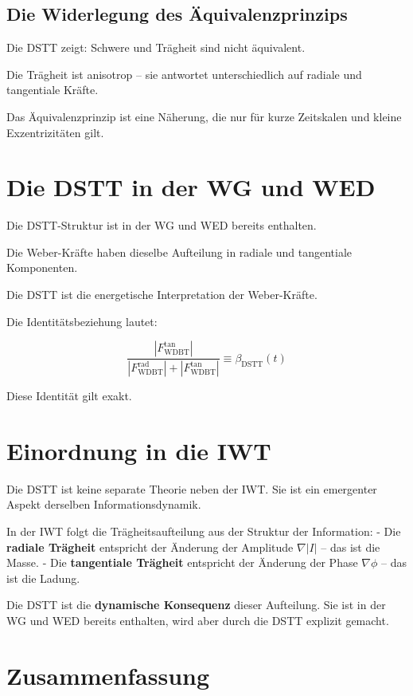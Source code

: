 \subsection{Die Widerlegung des Äquivalenzprinzips}

Die DSTT zeigt: Schwere und Trägheit sind nicht äquivalent.

Die Trägheit ist anisotrop – sie antwortet unterschiedlich auf radiale und tangentiale Kräfte.

Das Äquivalenzprinzip ist eine Näherung, die nur für kurze Zeitskalen und kleine Exzentrizitäten gilt.

\section{Die DSTT in der WG und WED}

Die DSTT-Struktur ist in der WG und WED bereits enthalten.

Die Weber-Kräfte haben dieselbe Aufteilung in radiale und tangentiale Komponenten.

Die DSTT ist die energetische Interpretation der Weber-Kräfte.

Die Identitätsbeziehung lautet:

\[
\frac{|F_{\text{WDBT}}^{\text{tan}}|}{|F_{\text{WDBT}}^{\text{rad}}| + |F_{\text{WDBT}}^{\text{tan}}|}
\equiv \beta_{\text{DSTT}}(t)
\]

Diese Identität gilt exakt.

\section{Einordnung in die IWT}

Die DSTT ist keine separate Theorie neben der IWT. Sie ist ein emergenter Aspekt derselben Informationsdynamik.

In der IWT folgt die Trägheitsaufteilung aus der Struktur der Information:
- Die \textbf{radiale Trägheit} entspricht der Änderung der Amplitude \( \nabla |I| \) – das ist die Masse.
- Die \textbf{tangentiale Trägheit} entspricht der Änderung der Phase \( \nabla \phi \) – das ist die Ladung.

Die DSTT ist die \textbf{dynamische Konsequenz} dieser Aufteilung. Sie ist in der WG und WED bereits enthalten, wird aber durch die DSTT explizit gemacht.

\section{Zusammenfassung}

